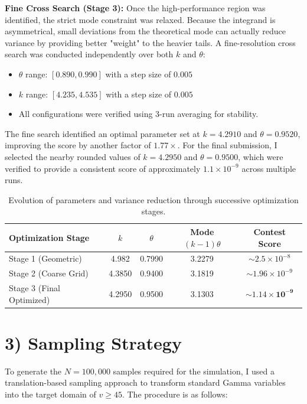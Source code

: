 \documentclass{article}
\begin{document}
\textbf{Fine Cross Search (Stage 3):} 
Once the high-performance region was identified, the strict mode constraint was relaxed. Because the integrand is asymmetrical, small deviations from the theoretical mode can actually reduce variance by providing better "weight" to the heavier tails. A fine-resolution cross search was conducted independently over both $k$ and $\theta$:
\begin{itemize}
    \item $\theta$ range: $[0.890, 0.990]$ with a step size of $0.005$
    \item $k$ range: $[4.235, 4.535]$ with a step size of $0.005$
    \item All configurations were verified using 3-run averaging for stability.
\end{itemize}

The fine search identified an optimal parameter set at $k = 4.2910$ and $\theta = 0.9520$, improving the score by another factor of $1.77\times$. For the final submission, I selected the nearby rounded values of $k = 4.2950$ and $\theta = 0.9500$, which were verified to provide a consistent score of approximately $1.1 \times 10^{-9}$ across multiple runs.

\begin{table}[h!]
    \centering
    \renewcommand{\arraystretch}{1.2}
    \begin{tabular}{|l|c|c|c|c|}
    \hline
    \textbf{Optimization Stage} & \textbf{$k$} & \textbf{$\theta$} & \textbf{Mode $(k-1)\theta$} & \textbf{Contest Score} \\ \hline
    Stage 1 (Geometric) & 4.982 & 0.7990 & 3.2279 & $\sim 2.5 \times 10^{-8}$ \\ \hline
    Stage 2 (Coarse Grid) & 4.3850 & 0.9400 & 3.1819 & $\sim 1.96 \times 10^{-9}$ \\ \hline
    Stage 3 (Final Optimized) & 4.2950 & 0.9500 & 3.1303 & $\mathbf{\sim 1.14 \times 10^{-9}}$ \\ \hline
    \end{tabular}
    \caption{Evolution of parameters and variance reduction through successive optimization stages.}
\end{table}
\section*{3) Sampling Strategy}

To generate the $N = 100,000$ samples required for the simulation, I used a translation-based sampling approach to transform standard Gamma variables into the target domain of $v \geq 45$. The procedure is as follows:
\end{document}
